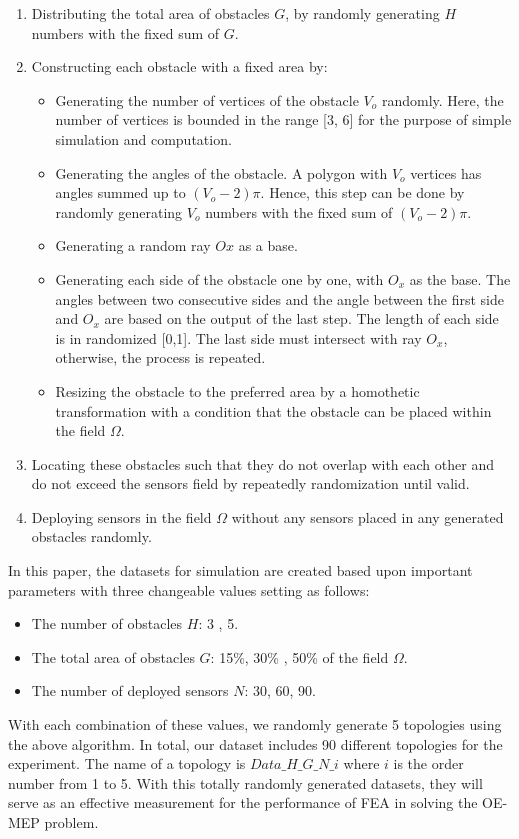 \documentclass[final]{elsarticle}
\begin{document}
\begin{enumerate}
	\item Distributing the total area of obstacles $G$, by randomly generating $H$ numbers with the fixed sum of $G$.
	\item Constructing each obstacle with a fixed area by:
	\begin{itemize}
		\item Generating the number of vertices of the obstacle $V_o$ randomly. Here, the number of vertices is bounded in the range [3, 6] for the purpose of simple simulation and computation. 
		\item Generating the angles of the obstacle. A polygon with $V_o$ vertices has angles summed up to $(V_o - 2)\pi$. Hence, this step can be done by randomly generating $V_o$ numbers with the fixed sum of $(V_o - 2)\pi$.
		\item Generating a random ray $Ox$ as a base.
		\item Generating each side of the obstacle one by one, with $O_x$ as the base. The angles between two consecutive sides and the angle between the first side and $O_x$ are based on the output of the last step. The length of each side is in randomized [0,1]. The last side must intersect with ray $O_x$, otherwise, the process is repeated.
		\item Resizing the obstacle to the preferred area by a homothetic transformation with a condition that the obstacle can be placed within the field $\Omega$.
	\end{itemize}
	\item Locating these obstacles such that they do not overlap with each other and do not exceed the sensors field by repeatedly randomization until valid.
	\item Deploying sensors in the field $\Omega$ without any sensors placed in any generated obstacles randomly.
\end{enumerate}

In this paper, the datasets for simulation are created based upon important parameters with three changeable values setting as follows:
\begin{itemize}
	\item The number of obstacles $H$: 3 , 5.
	\item The total area of obstacles $G$: 15\%, 30\% , 50\% of the field $\Omega$.
	\item The number of deployed sensors $N$: 30, 60, 90.
\end{itemize}
With each combination of these values, we randomly generate 5 topologies using the above algorithm. In total, our dataset includes 90 different topologies for the experiment. The name of a topology is $Data\_H\_G\_N\_i$ where $ i $ is the order number from 1 to 5. With this totally randomly generated datasets, they will serve as an effective measurement for the performance of FEA in solving the OE-MEP problem. 
\end{document}
